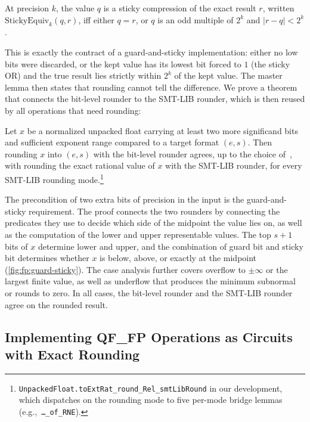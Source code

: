\begin{definition}\label{def:fp:sticky-compression}
At precision $k$, the value $q$ is a sticky compression of the exact
result $r$, written $\mathrm{StickyEquiv}_k(q, r)$, iff either $q = r$,
or $q$ is an odd multiple of $2^k$ and $|r - q| < 2^k$.
\end{definition}

This is exactly the contract of a guard-and-sticky implementation:
either no low bits were discarded, or the kept value has its lowest bit forced to $1$ (the sticky OR)
and the true result lies strictly within $2^k$ of the kept value.
The master lemma
then states that rounding cannot tell the difference.
We prove a theorem that connects the bit-level rounder to the SMT-LIB rounder,
which is then reused by all operations that need rounding:

\begin{theorem}\label{thm:fp:rounding-bridge}
Let $x$ be a normalized unpacked float carrying at least two more
significand bits and sufficient exponent range compared to a target format $(e, s)$.
Then rounding $x$ into $(e, s)$ with the bit-level rounder agrees, up to the
choice of~\nan{}, with rounding the exact rational value of $x$
with the SMT-LIB rounder, for every SMT-LIB rounding mode.\footnote{%
\texttt{UnpackedFloat.toExtRat\_round\_Rel\_smtLibRound} in our development,
which dispatches on the rounding mode to five per-mode bridge lemmas (e.g.,~\texttt{\ldots\_of\_RNE}).}
\end{theorem}

The precondition of two extra bits of precision in the input is the guard-and-sticky requirement.
The proof connects the two rounders by connecting the predicates they use to decide which side of the midpoint the value lies on,
as well as the computation of the lower and upper representable values.
The top $s+1$ bits of $x$ determine $\mathrm{lower}$ and $\mathrm{upper}$,
and the combination of guard bit and sticky bit determines whether $x$ is below, above, or exactly at the midpoint (\cref{fig:fp:guard-sticky}).
The case analysis further covers overflow to $\pm\infty$ or the largest finite value,
as well as underflow that produces the minimum subnormal or rounds to zero.
In all cases, the bit-level rounder and the SMT-LIB rounder agree on the rounded result.

\subsection{Implementing QF\_FP Operations as Circuits with Exact Rounding}\label{sec:fp:operations}

